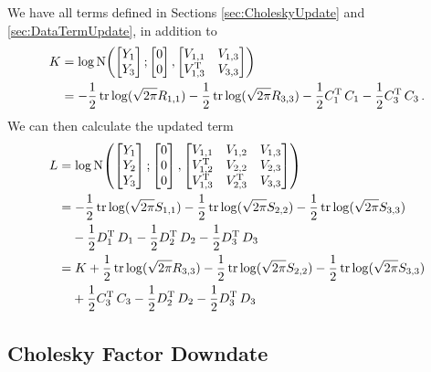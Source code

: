 \documentclass{acmsmall}
\begin{document}
We have all terms defined in Sections \ref{sec:CholeskyUpdate} and \ref{sec:DataTermUpdate}, in addition to 
\begin{align*}
K & = \log \N{\begin{bmatrix} Y_1\\Y_3 \end{bmatrix}}
{\begin{bmatrix}0\\0\end{bmatrix}}
{\begin{bmatrix} V_{1,1} & V_{1,3} \\ V^\tr_{1,3} & V_{3,3} \end{bmatrix}}\\
& = -\frac{1}{2} \trace \log (\sqrt{2 \pi} R_{1,1}) -\frac{1}{2} \trace \log (\sqrt{2 \pi} R_{3,3}) - \frac{1}{2} C_1^\tr\, C_1 - \frac{1}{2} C_3^\tr\, C_3\,.
\end{align*}
We can then calculate the updated term
\begin{align}
L & = \log \N{\begin{bmatrix} Y_1\\Y_2\\Y_3 \end{bmatrix}}
{\begin{bmatrix}0\\0\\0\end{bmatrix}}
{\begin{bmatrix} V_{1,1} & V_{1,2} & V_{1,3} \\ V^\tr_{1,2} & V_{2,2} & V_{2,3} \\ V^\tr_{1,3} & V^\tr_{2,3} & V_{3,3} \end{bmatrix}}
\nonumber\\
& = -\frac{1}{2} \trace \log (\sqrt{2 \pi} S_{1,1}) -\frac{1}{2} \trace \log (\sqrt{2 \pi} S_{2,2})-\frac{1}{2} \trace \log (\sqrt{2 \pi} S_{3,3}) 
\nonumber\\
&\phantom{=}\; - \frac{1}{2} D_1^\tr\, D_1 - \frac{1}{2} D_2^\tr\, D_2- \frac{1}{2} D_3^\tr\, D_3
\nonumber\\
& = K + \frac{1}{2} \trace \log (\sqrt{2 \pi} R_{3,3}) - \frac{1}{2} \trace \log (\sqrt{2 \pi} S_{2,2})-\frac{1}{2} \trace \log (\sqrt{2 \pi} S_{3,3})
\nonumber\\
&\phantom{=}\; + \frac{1}{2} C_3^\tr\, C_3 - \frac{1}{2} D_2^\tr\, D_2- \frac{1}{2} D_3^\tr\, D_3
\end{align}

\subsection{Cholesky Factor Downdate} \label{sec:CholeskyDowndate}
\end{document}
